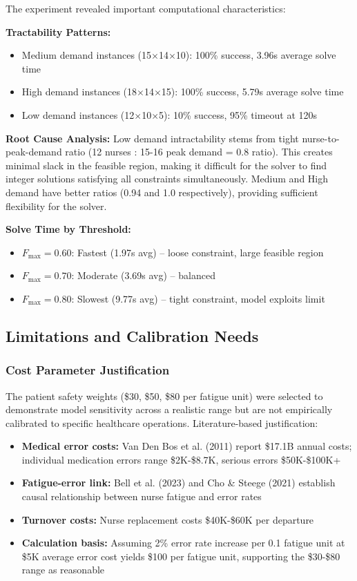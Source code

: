 \documentclass[11pt,letterpaper]{article}
\begin{document}
The experiment revealed important computational characteristics:

\textbf{Tractability Patterns:}
\begin{itemize}[leftmargin=*]
    \item Medium demand instances (15$\times$14$\times$10): 100\% success, 3.96s average solve time
    \item High demand instances (18$\times$14$\times$15): 100\% success, 5.79s average solve time
    \item Low demand instances (12$\times$10$\times$5): 10\% success, 95\% timeout at 120s
\end{itemize}

\textbf{Root Cause Analysis:} Low demand intractability stems from tight nurse-to-peak-demand ratio (12 nurses : 15-16 peak demand = 0.8 ratio). This creates minimal slack in the feasible region, making it difficult for the solver to find integer solutions satisfying all constraints simultaneously. Medium and High demand have better ratios (0.94 and 1.0 respectively), providing sufficient flexibility for the solver.

\textbf{Solve Time by Threshold:}
\begin{itemize}[leftmargin=*]
    \item $F_{\max}=0.60$: Fastest (1.97s avg) -- loose constraint, large feasible region
    \item $F_{\max}=0.70$: Moderate (3.69s avg) -- balanced
    \item $F_{\max}=0.80$: Slowest (9.77s avg) -- tight constraint, model exploits limit
\end{itemize}

\subsection{Limitations and Calibration Needs}

\subsubsection{Cost Parameter Justification}
The patient safety weights (\$30, \$50, \$80 per fatigue unit) were selected to demonstrate model sensitivity across a realistic range but are not empirically calibrated to specific healthcare operations. Literature-based justification:

\begin{itemize}[leftmargin=*]
    \item \textbf{Medical error costs:} Van Den Bos et al. (2011) report \$17.1B annual costs; individual medication errors range \$2K-\$8.7K, serious errors \$50K-\$100K+
    \item \textbf{Fatigue-error link:} Bell et al. (2023) and Cho \& Steege (2021) establish causal relationship between nurse fatigue and error rates
    \item \textbf{Turnover costs:} Nurse replacement costs \$40K-\$60K per departure
    \item \textbf{Calculation basis:} Assuming 2\% error rate increase per 0.1 fatigue unit at \$5K average error cost yields \$100 per fatigue unit, supporting the \$30-\$80 range as reasonable
\end{itemize}
\end{document}
